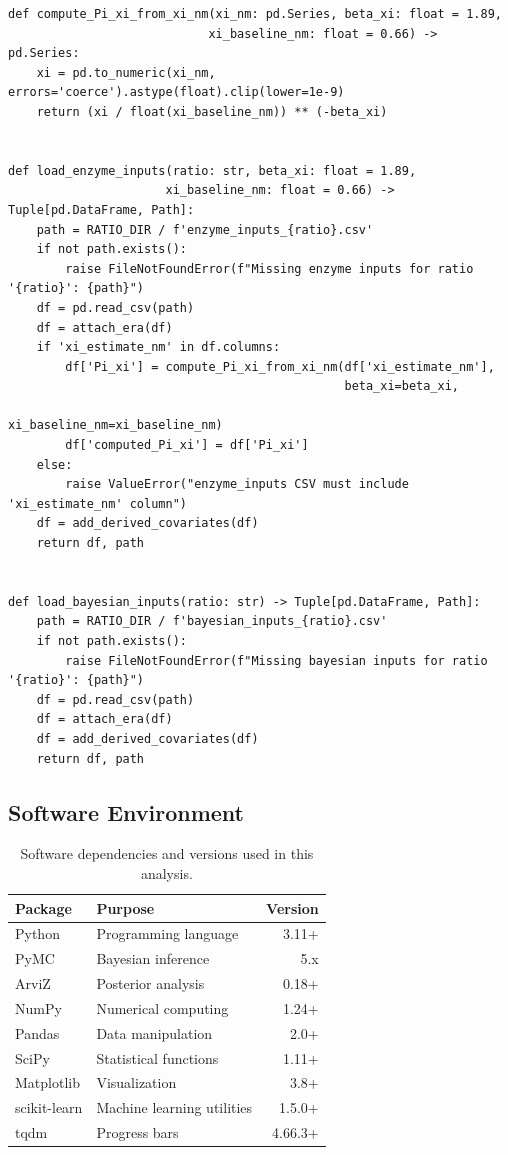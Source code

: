 \documentclass[11pt]{article}
\begin{document}
\begin{lstlisting}[caption={Data Loaders (Complete File)}]
def compute_Pi_xi_from_xi_nm(xi_nm: pd.Series, beta_xi: float = 1.89,
                            xi_baseline_nm: float = 0.66) -> pd.Series:
    xi = pd.to_numeric(xi_nm, errors='coerce').astype(float).clip(lower=1e-9)
    return (xi / float(xi_baseline_nm)) ** (-beta_xi)


def load_enzyme_inputs(ratio: str, beta_xi: float = 1.89,
                      xi_baseline_nm: float = 0.66) -> Tuple[pd.DataFrame, Path]:
    path = RATIO_DIR / f'enzyme_inputs_{ratio}.csv'
    if not path.exists():
        raise FileNotFoundError(f"Missing enzyme inputs for ratio '{ratio}': {path}")
    df = pd.read_csv(path)
    df = attach_era(df)
    if 'xi_estimate_nm' in df.columns:
        df['Pi_xi'] = compute_Pi_xi_from_xi_nm(df['xi_estimate_nm'],
                                               beta_xi=beta_xi,
                                               xi_baseline_nm=xi_baseline_nm)
        df['computed_Pi_xi'] = df['Pi_xi']
    else:
        raise ValueError("enzyme_inputs CSV must include 'xi_estimate_nm' column")
    df = add_derived_covariates(df)
    return df, path


def load_bayesian_inputs(ratio: str) -> Tuple[pd.DataFrame, Path]:
    path = RATIO_DIR / f'bayesian_inputs_{ratio}.csv'
    if not path.exists():
        raise FileNotFoundError(f"Missing bayesian inputs for ratio '{ratio}': {path}")
    df = pd.read_csv(path)
    df = attach_era(df)
    df = add_derived_covariates(df)
    return df, path
\end{lstlisting}

\newpage
\subsection{Software Environment}

\begin{table}[htbp]
\centering
\caption{Software dependencies and versions used in this analysis.}
\begin{tabular}{llr}
\toprule
\textbf{Package} & \textbf{Purpose} & \textbf{Version} \\
\midrule
Python & Programming language & 3.11+ \\
PyMC & Bayesian inference & 5.x \\
ArviZ & Posterior analysis & 0.18+ \\
NumPy & Numerical computing & 1.24+ \\
Pandas & Data manipulation & 2.0+ \\
SciPy & Statistical functions & 1.11+ \\
Matplotlib & Visualization & 3.8+ \\
scikit-learn & Machine learning utilities & 1.5.0+ \\
tqdm & Progress bars & 4.66.3+ \\
\bottomrule
\end{tabular}
\end{table}
\end{document}
